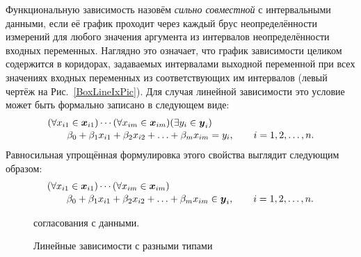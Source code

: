 \documentclass[a5paper,openany]{book}
\newcommand{\mbf}[1]{\protect\text{\boldmath$#1$}}
\begin{document}
Функциональную зависимость назовём \textit{сильно совместной} с интервальными данными, 
если её график проходит через каждый брус неопределённости измерений для любого значения 
аргумента из интервалов неопределённости входных переменных. Наглядно это означает, что 
график зависимости целиком содержится в коридорах, задаваемых интервалами выходной 
переменной при всех значениях входных переменных из соответствующих им интервалов 
(левый чертёж на Рис.~\ref{BoxLineIxPic}). Для случая линейной зависимости это условие 
может быть формально записано в следующем виде:  
\begin{equation*} 
\index{сильно совместная зависимость} 
\begin{array}{l}
(\forall x_{i1}\in\mbf{x}_{i1}) \cdots (\forall x_{im}\in\mbf{x}_{im}) 
                                                    (\exists y_{i}\in\mbf{y}_{i}) \\[1pt]   
\qquad \beta_0 + \beta_1 x_{i1} + \beta_2 x_{i2} + \ldots + \beta_m x_{im} = y_{i}, 
\qquad i = 1,2,\ldots,n. 
\end{array} 
\end{equation*} 
Равносильная упрощённая формулировка этого свойства выглядит следующим образом: 
\begin{equation*} 
\begin{array}{l}
(\forall x_{i1}\in\mbf{x}_{i1}) \cdots (\forall x_{im}\in\mbf{x}_{im}) \\[1pt]  
\qquad \beta_0 + \beta_1 x_{i1} + \beta_2 x_{i2} + \ldots + \beta_m x_{im} \in\mbf{y}_{i}, 
\qquad i = 1,2,\ldots,n. 
\end{array} 
\end{equation*} 
  

\begin{figure}[htb]
\centering\small 
\unitlength=1mm 
\caption{Линейные зависимости с разными типами} 
            согласования с данными.
\label{WeakStrongPic}  
\end{figure}
  
\end{document}
